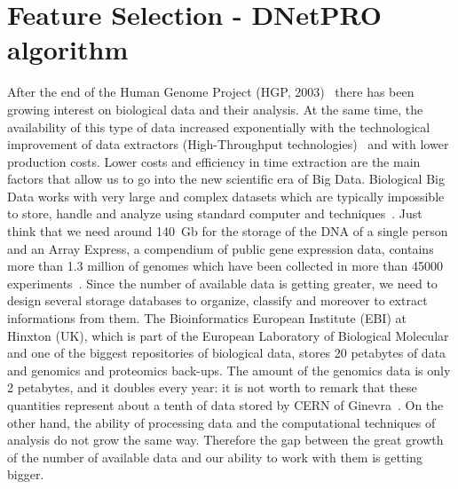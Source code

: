 \documentclass{standalone}
\begin{document}
\chapter[Feature Selection]{Feature Selection - DNetPRO algorithm}\label{featsel}



After the end of the Human Genome Project (HGP, 2003)~\cite{McKinney2012} there has been growing interest on biological data and their analysis.
At the same time, the availability of this type of data  increased exponentially with the technological improvement of data extractors (High-Throughput technologies)~\cite{Reuter2015} and with lower production costs.
Lower costs and efficiency in time extraction are the main factors that allow us to go into the new scientific era of Big Data.
Biological Big Data works with very large and complex datasets which are typically impossible to store, handle and analyze using standard computer and techniques~\cite{Kumari2014}.
Just think that we need around 140~Gb for the storage of the DNA of a single person and an Array Express, a compendium of public gene expression data, contains more than 1.3 million of genomes which have been collected in more than 45000 experiments~\cite{Greene2014}.
Since the number of available data is getting greater, we need to design several storage databases to organize, classify and moreover to extract informations from them.
The Bioinformatics European Institute (EBI) at Hinxton (UK), which is part of the European Laboratory of Biological Molecular and one of the biggest repositories of biological data, stores 20 petabytes of data and genomics and proteomics back-ups.
The amount of the genomics data is only 2 petabytes, and it doubles every year: it is not worth to remark that these quantities represent about a tenth of data stored by CERN of Ginevra~\cite{Marx2013}.
On the other hand, the ability of processing data and the computational techniques of analysis do not grow the same way.
Therefore the gap between the great growth of the number of available data and our ability to work with them is getting bigger.
\end{document}
